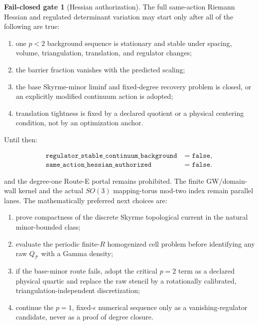 \documentclass[11pt]{article}
\numberwithin{equation}{section}
\theoremstyle{definition}
\newtheorem{gate}[theorem]{Fail-closed gate}
\theoremstyle{remark}
\newcommand{\cT}{\mathcal T}
\begin{document}
\begin{gate}[Hessian authorization]
The full same-action Riemann Hessian and regulated determinant variation may
start only after all of the following are true:

\begin{enumerate}
\item one $p<2$ background sequence is stationary and stable under spacing,
volume, triangulation, translation, and regulator changes;
\item the barrier fraction vanishes with the predicted scaling;
\item the base Skyrme-minor liminf and fixed-degree recovery problem is
closed, or an explicitly modified continuum action is adopted;
\item translation tightness is fixed by a declared quotient or a physical
centering condition, not by an optimization anchor.
\end{enumerate}
\end{gate}

Until then:

\begin{align*}
 \texttt{regulator\_stable\_continuum\_background}&=\texttt{false},\\
 \texttt{same\_action\_hessian\_authorized}&=\texttt{false}.
\end{align*}

and the degree-one Route-E portal remains prohibited.  The finite
GW/domain-wall kernel and the actual $SO(3)$ mapping-torus mod-two index
remain parallel lanes.  The mathematically preferred next choices are:

\begin{enumerate}
\item prove compactness of the discrete Skyrme topological current in the
natural minor-bounded class;
\item evaluate the periodic finite-$R$ homogenized cell problem before
identifying any raw $Q_{\cT}$ with a Gamma density;
\item if the base-minor route fails, adopt the critical $p=2$ term as a declared physical
quartic and replace the raw stencil by a rotationally calibrated,
triangulation-independent discretization;
\item continue the $p=1$, fixed-$\epsilon$ numerical sequence only as a
vanishing-regulator candidate, never as a proof of degree closure.
\end{enumerate}



\end{document}
